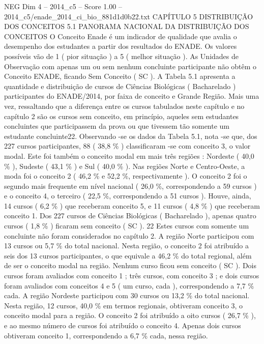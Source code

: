 \begin{textsample}{NEG Dim 4 – 2014\_c5 – Score 1.00 – 2014\_c5/enade\_2014\_ci\_bio\_881d1d0b22.txt}  \label{ex:f4_neg_205}
CAPÍTULO 5 DISTRIBUIÇÃO DOS CONCEITOS 5.1 PANORAMA NACIONAL DA DISTRIBUIÇÃO DOS CONCEITOS O Conceito Enade é um indicador de qualidade que avalia o desempenho dos estudantes a partir dos resultados do ENADE.
Os valores possíveis vão de 1 ( pior situação ) a 5 ( melhor situação ).
As Unidades de Observação com apenas um ou sem nenhum concluinte participante não obtêm o Conceito ENADE, ficando Sem Conceito ( SC ).
A Tabela 5.1 apresenta a quantidade e distribuição de cursos de Ciências Biológicas ( Bacharelado ) participantes do ENADE/2014, por faixa de conceito e Grande Região.
Mais uma vez, ressaltando que a diferença entre os cursos tabulados neste capítulo e no capítulo 2 são os cursos sem conceito, em princípio, aqueles sem estudantes concluintes que participassem da prova ou que tivessem tão somente um estudante concluinte22.
Observando -se os dados da Tabela 5.1, nota -se que, dos 227 cursos participantes, 88 ( 38,8 \% ) classificaram -se com conceito 3, o valor modal.
Este foi também o conceito modal em mais três regiões : Nordeste ( 40,0 \% ), Sudeste ( 43,1 \% ) e Sul ( 40,0 \% ).
Nas regiões Norte e Centro-Oeste, a moda foi o conceito 2 ( 46,2 \% e 52,2 \%, respectivamente ).
O conceito 2 foi o segundo mais frequente em nível nacional ( 26,0 \%, correspondendo a 59 cursos ) e o conceito 4, o terceiro ( 22,5 \%, correspondendo a 51 cursos ).
Houve, ainda, 14 cursos ( 6,2 \% ) que receberam conceito 5, e 11 cursos ( 4,8 \% ) que receberam conceito 1.
Dos 227 cursos de Ciências Biológicas ( Bacharelado ), apenas quatro cursos ( 1,8 \% ) ficaram sem conceito ( SC ). 22 Estes cursos com somente um concluinte não foram considerados no capítulo 2.
A região Norte participou com 13 cursos ou 5,7 \% do total nacional.
Nesta região, o conceito 2 foi atribuído a seis dos 13 cursos participantes, o que equivale a 46,2 \% do total regional, além de ser o conceito modal na região.
Nenhum curso ficou sem conceito ( SC ).
Dois cursos foram avaliados com conceito 1 ; três cursos, com conceito 3 ; e dois cursos foram avaliados com conceitos 4 e 5 ( um curso, cada ), correspondendo a 7,7 \% cada.
A região Nordeste participou com 30 cursos ou 13,2 \% do total nacional.
Nesta região, 12 cursos, 40,0 \% em termos regionais, obtiveram conceito 3, o conceito modal para a região.
O conceito 2 foi atribuído a oito cursos ( 26,7 \% ), e ao mesmo número de cursos foi atribuído o conceito 4.
Apenas dois cursos obtiveram conceito 1, correspondendo a 6,7 \% cada, nessa região.

\end{textsample}
